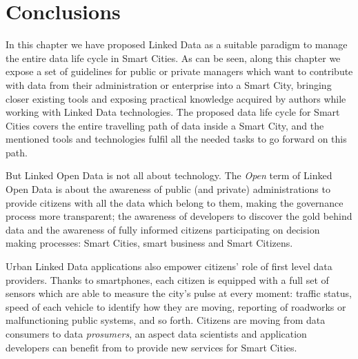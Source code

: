 \section{Conclusions}

In this chapter we have proposed Linked Data as a suitable paradigm to manage the entire data life cycle in Smart Cities. As can be seen, along this chapter we expose a set of guidelines for public or private managers which want to contribute with data from their administration or enterprise into a Smart City, bringing closer existing tools and exposing practical knowledge acquired by authors while working with Linked Data technologies. The proposed data life cycle for Smart Cities covers the entire travelling path of data inside a Smart City, and the mentioned tools and technologies fulfil all the needed tasks to go forward on this path.

But Linked Open Data is not all about technology. The \textit{Open} term of Linked Open Data is about the awareness of public (and private) administrations to provide citizens with all the data which belong to them, making the governance process more transparent; the awareness of developers to discover the gold behind data and the awareness of fully informed citizens participating on decision making processes: Smart Cities, smart business and Smart Citizens.

Urban Linked Data applications also empower citizens' role of first level data providers. Thanks to smartphones, each citizen is equipped with a full set of sensors which are able to measure the city's pulse at every moment: traffic status, speed of each vehicle to identify how they are moving, reporting of roadworks or malfunctioning public systems, and so forth. Citizens are moving from data consumers to data \textit{prosumers}, an aspect data scientists and application developers can benefit from to provide new services for Smart Cities.
